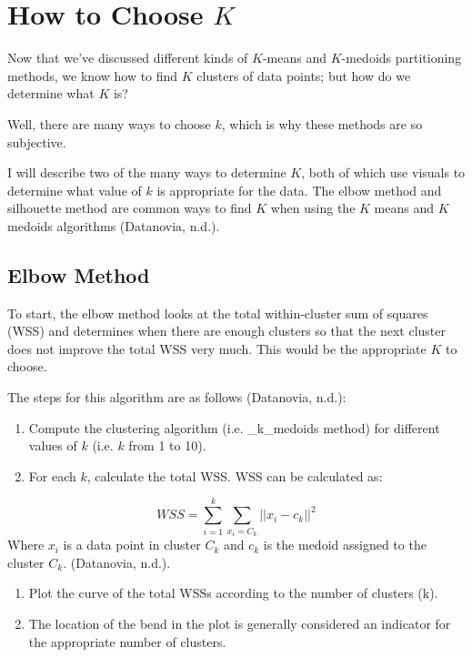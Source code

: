 \documentclass[12pt,twoside]{amherstthesis}
\begin{document}
  \section{\texorpdfstring{How to Choose
  \(K\)}{How to Choose K}}\label{how-to-choose-k}
  
  Now that we've discussed different kinds of \(K\)-means and
  \(K\)-medoids partitioning methods, we know how to find \(K\) clusters
  of data points; but how do we determine what \(K\) is?
  
  Well, there are many ways to choose \(k\), which is why these methods
  are so subjective.
  
  I will describe two of the many ways to determine \(K\), both of which
  use visuals to determine what value of \(k\) is appropriate for the
  data. The elbow method and silhouette method are common ways to find
  \(K\) when using the \(K\) means and \(K\) medoids algorithms
  (Datanovia, n.d.).
  
  \subsection{Elbow Method}\label{elbow-method}
  
  To start, the elbow method looks at the total within-cluster sum of
  squares (WSS) and determines when there are enough clusters so that the
  next cluster does not improve the total WSS very much. This would be the
  appropriate \(K\) to choose.
  
  The steps for this algorithm are as follows (Datanovia, n.d.):
  
  \begin{enumerate}
  \def\labelenumi{\arabic{enumi}.}
  \item
    Compute the clustering algorithm (i.e. \_k\_medoids method) for
    different values of \(k\) (i.e. \(k\) from 1 to 10).
  \item
    For each \(k\), calculate the total WSS. WSS can be calculated as:
  \end{enumerate}
  
  \[WSS= \sum_{i=1}^k \sum_{x_i = C_k} ||{{x_i- c_k}}||^2\] Where \(x_i\)
  is a data point in cluster \(C_k\) and \(c_k\) is the medoid assigned to
  the cluster \(C_k\). (Datanovia, n.d.).
  
  \begin{enumerate}
  \def\labelenumi{\arabic{enumi}.}
  \setcounter{enumi}{2}
  \item
    Plot the curve of the total WSSs according to the number of clusters
    (k).
  \item
    The location of the bend in the plot is generally considered an
    indicator for the appropriate number of clusters.
  \end{enumerate}
  
\end{document}

